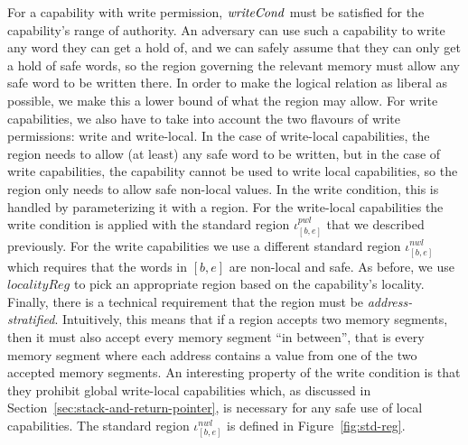 \documentclass[format=acmsmall, review=true, screen=true]{acmart}
\renewcommand{\figurename}{Figure}
\renewcommand{\sectionname}{Section}
\newcommand{\var}[1]{\mathit{#1}}
\newcommand{\start}{\var{b}}
\newcommand{\addrend}{\var{e}}
\newcommand{\nwl}{\var{nwl}}
\newcommand{\pwl}{\var{pwl}}
\newcommand{\plainfun}[2]{
  \ifthenelse{\equal{#2}{}}
  {\mathit{#1}}
  {\mathit{#1}(#2)}
}
\newcommand{\writeCond}[1]{\plainfun{writeCond}{#1}}
\begin{document}
For a capability with write permission, $\writeCond{}$ must be satisfied for the
capability's range of authority. An adversary can use such a capability to write
any word they can get a hold of, and we can safely assume that they can only get
a hold of safe words, so the region governing the relevant memory must allow any
safe word to be written there. In order to make the logical relation as liberal
as possible, we make this a lower bound of what the region may allow. 
For write capabilities, we also have to take into account
the two flavours of write permissions: write and write-local. In the case of
write-local capabilities, the region needs to allow (at least) any safe word to
be written, but in the case of write capabilities, the capability cannot be used
to write local capabilities, so the region only needs to allow safe non-local
values. In the write condition, this is handled by parameterizing it with a
region. For the write-local capabilities the write condition is applied with the
standard region $\iota^\pwl_{[\start,\addrend]}$ that we described previously. For
the write capabilities we use a different standard region
$\iota^\nwl_{[\start,\addrend]}$ which requires that the words in
$[\start,\addrend]$ are non-local and safe. As before, we use
$\var{localityReg}$ to pick an appropriate region based on the capability's
locality. Finally, there is a technical requirement that the region must be
\emph{address-stratified}. Intuitively, this means that if a region accepts two
memory segments, then it must also accept every memory segment ``in between'',
that is every memory segment where each address contains a value from one of the
two accepted memory segments. An interesting property of the write condition is
that they prohibit global write-local capabilities which, as discussed in
\sectionname~\ref{sec:stack-and-return-pointer}, is necessary for any safe use of
local capabilities.
The standard region $\iota^\nwl_{[\start,\addrend]}$ is defined in \figurename~\ref{fig:std-reg}.
\end{document}
